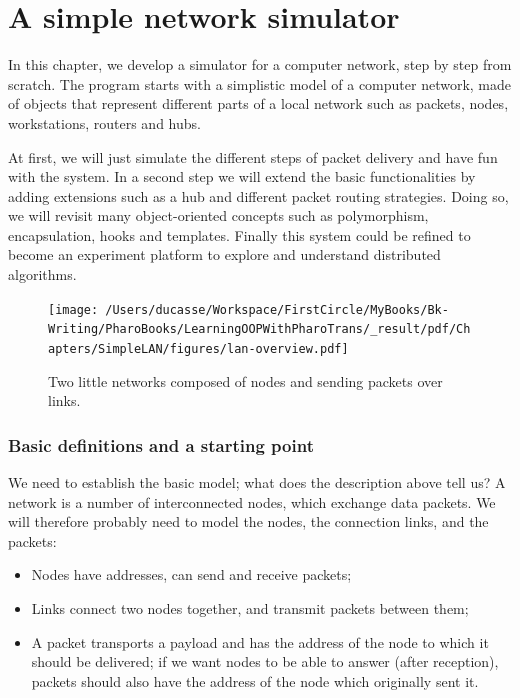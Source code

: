 \documentclass[10pt,twoside,english]{_support/latex/sbabook/sbabook}
\begin{document}
\frontmatter
\pagestyle{plain}

\tableofcontents*
\clearpage\listoffigures

\mainmatter

\chapter{A simple network simulator }\label{ch:lan}
In this chapter, we develop a simulator for a computer network, step by step from scratch.
The program starts with a simplistic model of a computer network, made of objects that represent different parts of a local network such as packets, nodes, workstations, routers and hubs.

At first, we will just simulate the different steps of packet delivery and have fun with the system.
In a second step we will extend the basic functionalities by adding extensions such as a hub and different packet routing strategies.
Doing so, we will revisit many object-oriented concepts such as polymorphism, encapsulation, hooks and templates.
Finally this system could be refined to become an experiment platform to explore and understand distributed algorithms.


\begin{figure}

\begin{center}
\texttt{[image: /Users/ducasse/Workspace/FirstCircle/MyBooks/Bk-Writing/PharoBooks/LearningOOPWithPharoTrans/\_result/pdf/Chapters/SimpleLAN/figures/lan-overview.pdf]}\caption{Two little networks composed of nodes and sending packets over links.\label{/Users/ducasse/Workspace/FirstCircle/MyBooks/Bk-Writing/PharoBooks/LearningOOPWithPharoTrans/_result/pdf/Chapters/SimpleLAN/figures/lan-overview.pdf}}\end{center}
\end{figure}

\subsection{Basic definitions and a starting point}
We need to establish the basic model; what does the description above tell us?
A network is a number of interconnected nodes, which exchange data packets.
We will therefore probably need to model the nodes, the connection links, and the packets:

\begin{itemize}
\item Nodes have addresses, can send and receive packets;
\item Links connect two nodes together, and transmit packets between them;
\item A packet transports a payload and has the address of the node to which it should be delivered; if we want nodes to be able to answer (after reception), packets should also have the address of the node which originally sent it.
\end{itemize}
\end{document}
